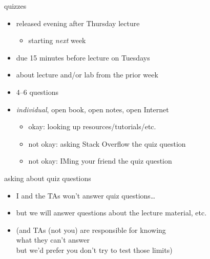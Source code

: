 \begin{frame}{quizzes}
    \begin{itemize}
    \item released evening after Thursday lecture
        \begin{itemize}
        \item starting \textit{next} week
        \end{itemize}
    \item due 15 minutes before lecture on Tuesdays
    \vspace{.5cm}
    \item about lecture and/or lab from the prior week
    \item 4--6 questions
    \item \textit{individual}, open book, open notes, open Internet
        \begin{itemize}
        \item okay: looking up resources/tutorials/etc.
        \item not okay: asking Stack Overflow the quiz question
        \item not okay: IMing your friend the quiz question
        \end{itemize}
    \end{itemize}
\end{frame}

\begin{frame}{asking about quiz questions}
    \begin{itemize}
    \item I and the TAs won't answer quiz questions\ldots
    \item but we will answer questions about the lecture material, etc.
    \vspace{.5cm}
    \item (and TAs (not you) are responsible for knowing \\
        what they can't answer \\
        but we'd prefer you don't try to test those limits)
    \end{itemize}
\end{frame}
